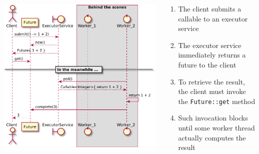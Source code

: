 \documentclass{beamer}\mode<presentation>{\usetheme{AMSCesenaPurpleAndGold}}
\begin{document}
\begin{frame}[allowframebreaks]
	\begin{columns}
		\begin{column}{.6\linewidth}
			\begin{center}
				\includegraphics[width=\linewidth]{img/submit.pdf}
			\end{center}
		\end{column}
		\begin{column}{.4\linewidth}
			\begin{enumerate}
				\item The client \alert{submits} a callable to an executor service
				
				\item The executor service \alert{immediately} returns a future to the client
				
				\item To retrieve the result, the client must invoke the \alert{\texttt{Future::get}} method
				
				\item Such invocation \alert{blocks} until some worker thread actually computes the result
			\end{enumerate}
		\end{column}
	\end{columns}

\end{frame}
\end{document}
